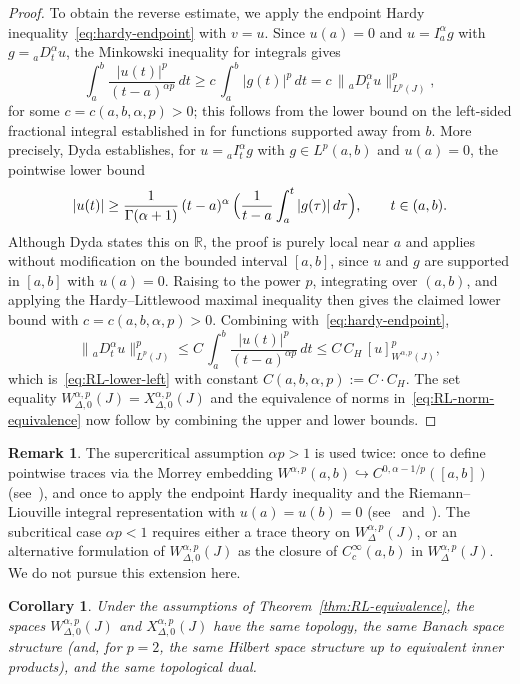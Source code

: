 \documentclass[11pt,a4paper]{article}
\numberwithin{equation}{section}
\newtheorem{corollary}[corollary]{Corollary}
\theoremstyle{definition}
\newtheorem{remark}[remark]{Remark}
\begin{document}
\begin{proof}[Proof]
To obtain the reverse estimate, we apply the endpoint Hardy
inequality~\eqref{eq:hardy-endpoint} with $v=u$. Since $u(a)=0$
and $u=I^\alpha_a g$ with $g={}_aD^\alpha_t u$, the
Minkowski inequality for integrals gives
\[
\int_a^b \frac{|u(t)|^p}{(t-a)^{\alpha p}}\,dt
\ge c\,\int_a^b |g(t)|^p\,dt
= c\,\|{}_aD^\alpha_t u\|^p_{L^p(J)},
\]
for some $c=c(a,b,\alpha,p)>0$; this follows from the lower bound
on the left-sided fractional integral established in
\cite[Lemma~2.1]{Dyda2004} for functions supported away from $b$.
More precisely, Dyda establishes, for
$u = {}_aI^\alpha_t g$ with $g \in L^p(a,b)$ and $u(a)=0$, the
pointwise lower bound
\[
|u(t)| \ge \frac{1}{\Gamma(\alpha+1)}\,(t-a)^\alpha\,
\Bigl(\frac{1}{t-a}\int_a^t |g(\tau)|\,d\tau\Bigr),
\qquad t\in(a,b).
\]
Although Dyda states this on $\mathbb{R}$, the proof is purely local
near $a$ and applies without modification on the bounded interval
$[a,b]$, since $u$ and $g$ are supported in $[a,b]$ with $u(a)=0$.
Raising to the power $p$, integrating over $(a,b)$, and applying
the Hardy--Littlewood maximal inequality then gives the claimed
lower bound with $c = c(a,b,\alpha,p) > 0$.
Combining with~\eqref{eq:hardy-endpoint},
\[
\|{}_aD^\alpha_t u\|^p_{L^p(J)}
\le C\,\int_a^b\frac{|u(t)|^p}{(t-a)^{\alpha p}}\,dt
\le C\,C_H\,[u]^p_{W^{\alpha,p}(J)},
\]
which is~\eqref{eq:RL-lower-left} with constant
$C(a,b,\alpha,p):=C\cdot C_H$.
The set equality $W^{\alpha,p}_{\Delta,0}(J)=X^{\alpha,p}_{\Delta,0}(J)$
and the equivalence of norms in~\eqref{eq:RL-norm-equivalence}
now follow by combining the upper and lower bounds.
\end{proof}

\begin{remark}\label{rem:subcritical-open}
The supercritical assumption $\alpha p > 1$ is used twice: once to
define pointwise traces via the Morrey embedding
$W^{\alpha,p}(a,b)\hookrightarrow C^{0,\alpha-1/p}([a,b])$
(see~\cite[Theorem~8.2]{DiNezzaPalatucciValdinoci2012}), and once
to apply the endpoint Hardy inequality and the Riemann--Liouville
integral representation with $u(a)=u(b)=0$
(see~\cite[Theorem~13.1]{SamkoKilbasMarichev1993}
and~\cite[Theorem~1]{Dyda2004}). The subcritical case $\alpha p < 1$
requires either a trace theory on $W^{\alpha,p}_\Delta(J)$, or an
alternative formulation of $W^{\alpha,p}_{\Delta,0}(J)$ as the
closure of $C^\infty_c(a,b)$ in $W^{\alpha,p}_\Delta(J)$.
We do not pursue this extension here.
\end{remark}

\begin{corollary}\label{cor:RL-equivalence-norms}
Under the assumptions of Theorem~\ref{thm:RL-equivalence}, the spaces
$W^{\alpha,p}_{\Delta,0}(J)$ and $X^{\alpha,p}_{\Delta,0}(J)$ have the
same topology, the same Banach space structure (and, for $p = 2$, the
same Hilbert space structure up to equivalent inner products), and the
same topological dual.
\end{corollary}
\end{document}
